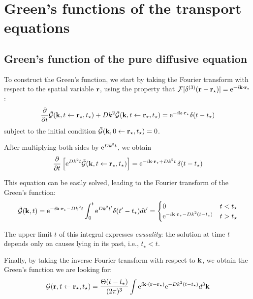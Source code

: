\section{Green's functions of the transport equations}
\label{sec:appgreen}

\subsection{Green's function of the pure diffusive equation}

To construct the Green's function, we start by taking the Fourier transform with respect to the spatial variable $\vb r$, using the property that $\mathcal F[\delta^{(3)}(\vb r - \vb r_\star)] = {\rm e}^{-i \vb k \cdot \vb r_\star}$ :
%
\begin{equation}
\frac{\partial}{\partial t} \tilde{\mathcal G}(\vb k, t \leftarrow \vb r_\star, t_\star) 
+ D k^2 \tilde{\mathcal G}(\vb k, t \leftarrow \vb r_\star, t_\star) 
= {\rm e}^{-i \vb k \cdot \vb r_\star} \delta(t - t_\star)
\end{equation}
%
subject to the initial condition $\tilde{\mathcal G}(\vb k, 0 \leftarrow \vb r_\star, t_\star) = 0$.

After multiplying both sides by ${\rm e}^{D k^2 t}$, we obtain
%
\begin{equation}
\frac{\partial}{\partial t} \left[ {\rm e}^{D k^2 t} \tilde{\mathcal G}(\vb k, t \leftarrow \vb r_\star, t_\star) \right]
= {\rm e}^{-i \vb k \cdot \vb r_\star + D k^2 t} \, \delta(t - t_\star)
\end{equation}

This equation can be easily solved, leading to the Fourier transform of the Green's function:
%
\begin{equation}
\tilde{\mathcal G}(\vb k, t) = 
{\rm e}^{-i \vb k \cdot \vb r_\star - D k^2 t} 
\int_0^t {\rm e}^{D k^2 t^\prime} \delta(t^\prime-t_\star) dt^\prime
= \begin{cases}
0 & t < t_\star \\
{\rm e}^{- i \vb k \cdot \vb r_\star - D k^2 (t-t_\star)} & t > t_\star
\end{cases}
\end{equation}

The upper limit $t$ of this integral expresses \emph{causality}: the solution at time $t$ depends only on causes lying in its past, i.e., $t_\star < t$.

Finally, by taking the inverse Fourier transform with respect to $\vb k$, we obtain the Green's function we are looking for:
%
\begin{equation}
\mathcal G (\vb r, t \leftarrow \vb r_\star, t_\star) 
= \frac{\Theta(t-t_\star)}{(2\pi)^3} 
\int {\rm e}^{i \vb k \cdot (\vb r - \vb r_\star)} {\rm e}^{-Dk^2 (t-t_\star)} d^3 \vb k
\end{equation}

